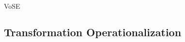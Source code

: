 \begin{copiedFrom}{VoSE}

\subsection{Transformation Operationalization}
\label{sec:approach:operationalization}


\end{copiedFrom}
